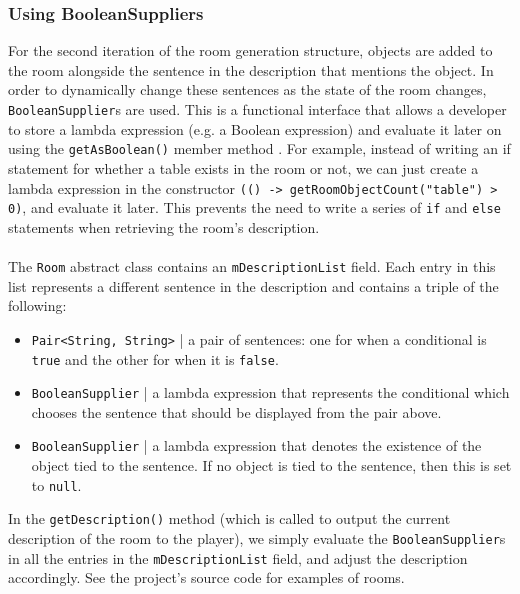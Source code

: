 \documentclass[11pt]{article}
\begin{document}
\subsubsection{Using BooleanSuppliers}

For the second iteration of the room generation structure, objects are added to the room alongside the sentence in the description that mentions the object. In order to dynamically change these sentences as the state of the room changes, \texttt{BooleanSupplier}s are used. This is a functional interface that allows a developer to store a lambda expression (e.g. a Boolean expression) and evaluate it later on using the \texttt{getAsBoolean()} member method \cite{RefWorks:125}. For example, instead of writing an if statement for whether a table exists in the room or not, we can just create a lambda expression in the constructor \texttt{(() -> getRoomObjectCount("table") > 0)}, and evaluate it later. This prevents the need to write a series of \texttt{if} and \texttt{else} statements when retrieving the room's description.
\\
\\
The \texttt{Room} abstract class contains an \texttt{mDescriptionList} field. Each entry in this list represents a different sentence in the description and contains a triple of the following:

\begin{itemize}
\item \texttt{Pair<String, String>} | a pair of sentences: one for when a conditional is \texttt{true} and the other for when it is \texttt{false}.

\item \texttt{BooleanSupplier} | a lambda expression that represents the conditional which chooses the sentence that should be displayed from the pair above.

\item \texttt{BooleanSupplier} | a lambda expression that denotes the existence of the object tied to the sentence. If no object is tied to the sentence, then this is set to \texttt{null}.
\end{itemize}

In the \texttt{getDescription()} method (which is called to output the current description of the room to the player), we simply evaluate the \texttt{BooleanSupplier}s in all the entries in the \texttt{mDescriptionList} field, and adjust the description accordingly. See the project's source code for examples of rooms.
\end{document}
